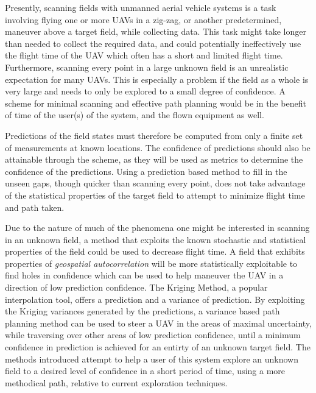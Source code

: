 Presently, scanning fields with unmanned aerial vehicle systems is a task involving flying one or more UAVs in a zig-zag, or another predetermined, maneuver above a target field, while collecting data. This task might take longer than needed to collect the required data, and could potentially ineffectively use the flight time of the UAV which often has a short and limited flight time. Furthermore, scanning every point in a large unknown field is an unrealistic expectation for many UAVs. This is especially a problem if the field as a whole is very large and needs to only be explored to a small degree of confidence. A scheme for minimal scanning and effective path planning would be in the benefit of time of the user(s) of the system, and the flown equipment as well. 

Predictions of the field states must therefore be computed from only a finite set of measurements at known locations. The confidence of predictions should also be attainable through the scheme, as they will be used as metrics to determine the confidence of the predictions. Using a prediction based method to fill in the unseen gaps, though quicker than scanning every point, does not take advantage of the statistical properties of the target field to attempt to minimize flight time and path taken. 

Due to the nature of much of the phenomena one might be interested in scanning in an unknown field, a method that exploits the known stochastic and statistical properties of the field could be used to decrease flight time. A field that exhibits properties of \textit{geospatial autocorrelation} will be more statistically exploitable to find holes in confidence which can be used to help maneuver the UAV in a direction of low prediction confidence. The Kriging Method, a popular interpolation tool, offers a prediction and a variance of prediction. By exploiting the Kriging variances generated by the predictions, a variance based path planning method can be used to steer a UAV in the areas of maximal uncertainty, while traversing over other areas of low prediction confidence, until a minimum confidence in prediction is achieved for an entirty of an unknown target field. The methods introduced attempt to help a user of this system explore an unknown field to a desired level of confidence in a short period of time, using a more methodical path, relative to current exploration techniques. 
